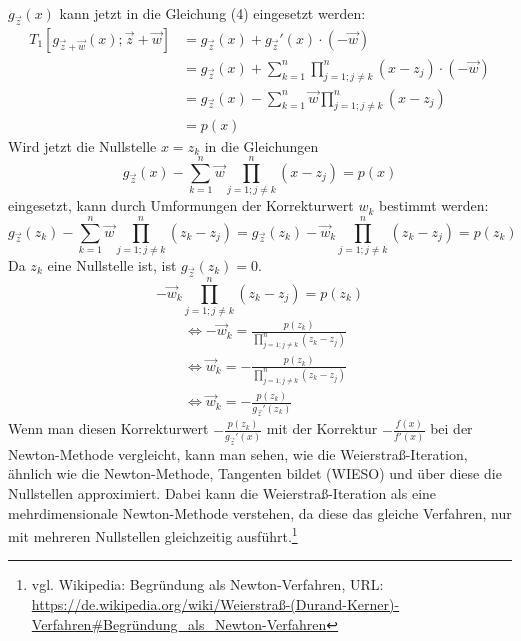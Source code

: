 \documentclass[12pt]{article}
\begin{document}
$g_{\vec{z}}(x)$ kann jetzt in die Gleichung (4) eingesetzt werden:
\begin{align*}
    T_1[g_{\vec{z} + \vec{w}}(x);\vec{z} + \vec{w}] &= g_{\vec{z}}(x)+g_{\vec{z}}'(x)\cdot (-\vec{w}) \\
                                                    &= g_{\vec{z}}(x)+\sum_{k=1}^{n}\prod_{j=1;j\neq k}^{n}(x-z_j)\cdot (-\vec{w}) \\
                                                    &= g_{\vec{z}}(x)-\sum_{k=1}^{n}\vec{w}\prod_{j=1;j\neq k}^{n}(x-z_j) \\
                                                    &= p(x)
\end{align*}
Wird jetzt die Nullstelle $x=z_k$ in die Gleichungen
\begin{equation}
    g_{\vec{z}}(x)-\sum_{k=1}^{n}\vec{w}\prod_{j=1;j\neq k}^{n}(x-z_j) = p(x)
\end{equation}
eingesetzt, kann durch Umformungen der Korrekturwert $w_k$ bestimmt werden:
\begin{equation*}
    g_{\vec{z}}(z_k)-\sum_{k=1}^{n}\vec{w}\prod_{j=1;j\neq k}^{n}(z_k-z_j) = g_{\vec{z}}(z_k)-\vec{w}_k\prod_{j=1;j\neq k}^{n}(z_k-z_j) = p(z_k)
\end{equation*}
Da $z_k$ eine Nullstelle ist, ist $g_{\vec{z}}(z_k) = 0$.
\begin{equation*}
    -\vec{w}_k\prod_{j=1;j\neq k}^{n}(z_k-z_j) = p(z_k)
\end{equation*}
\begin{align*}
    &\Leftrightarrow -\vec{w}_k = \frac{p(z_k)}{\prod_{j=1;j\neq k}^{n}(z_k-z_j)} \\
    &\Leftrightarrow \vec{w}_k = -\frac{p(z_k)}{\prod_{j=1;j\neq k}^{n}(z_k-z_j)} \\
    &\Leftrightarrow \vec{w}_k = -\frac{p(z_k)}{g_{\vec{z}}'(z_k)}
\end{align*}
Wenn man diesen Korrekturwert $-\frac{p(z_k)}{g_{\vec{z}}'(x)}$ mit der Korrektur $-\frac{f(x)}{f'(x)}$ bei der Newton-Methode vergleicht, kann man sehen, wie die Weierstraß-Iteration, ähnlich wie die Newton-Methode, Tangenten bildet (WIESO) und über diese die Nullstellen approximiert. Dabei kann die Weierstraß-Iteration als eine mehrdimensionale Newton-Methode verstehen, da diese das gleiche Verfahren, nur mit mehreren Nullstellen gleichzeitig ausführt.\footnote{vgl. Wikipedia: Begründung als Newton-Verfahren, URL: \url{https://de.wikipedia.org/wiki/Weierstraß-(Durand-Kerner)-Verfahren#Begründung_als_Newton-Verfahren}}
\end{document}
